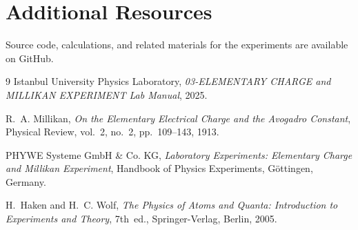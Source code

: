 \documentclass[journal]{IEEEtran}
\begin{document}
\section{Additional Resources}
Source code, calculations, and related materials for the experiments are available on GitHub.

\begin{figure}[H]
    \centering
    \begin{minipage}{0.15\textwidth}
        \centering
    \end{minipage}%
\end{figure}

\begin{thebibliography}{9}
\small
\setlength{\itemsep}{0pt}
\setlength{\parskip}{0pt}
Istanbul University Physics Laboratory,
\textit{03-ELEMENTARY CHARGE and MILLIKAN EXPERIMENT Lab Manual}, 2025.

R.~A. Millikan,
\textit{On the Elementary Electrical Charge and the Avogadro Constant},
Physical Review, vol.~2, no.~2, pp.~109--143, 1913.

PHYWE Systeme GmbH \& Co. KG,
\textit{Laboratory Experiments: Elementary Charge and Millikan Experiment},
Handbook of Physics Experiments, Göttingen, Germany.

H.~Haken and H.~C. Wolf,
\textit{The Physics of Atoms and Quanta: Introduction to Experiments and Theory},
7th~ed., Springer-Verlag, Berlin, 2005.
\end{thebibliography}
\end{document}
